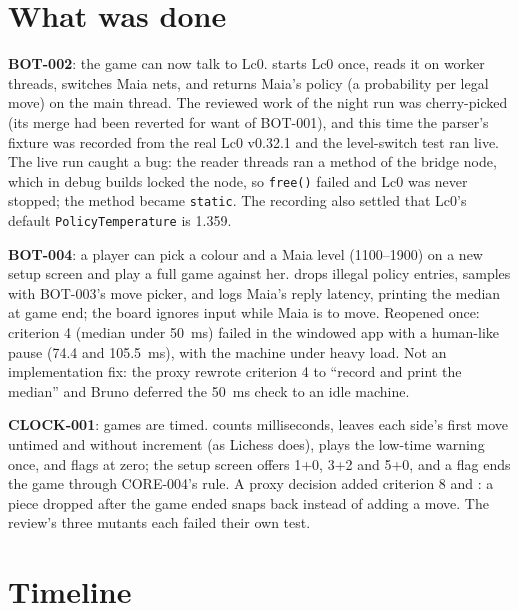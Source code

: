 \documentclass[11pt,a4paper]{article}
\begin{document}
\section*{What was done}

\textbf{BOT-002}: the game can now talk to Lc0.  starts Lc0 once, reads
it on worker threads, switches Maia nets, and returns Maia's policy (a probability per legal
move) on the main thread. The reviewed work of the night run was cherry-picked (its merge had
been reverted for want of BOT-001), and this time the parser's fixture was recorded from the
real Lc0 v0.32.1 and the level-switch test ran live. The live run caught a bug: the reader
threads ran a method of the bridge node, which in debug builds locked the node, so
\texttt{free()} failed and Lc0 was never stopped; the method became \texttt{static}. The
recording also settled that Lc0's default \texttt{PolicyTemperature} is 1.359.

\textbf{BOT-004}: a player can pick a colour and a Maia level (1100--1900) on a new setup
screen and play a full game against her.  drops illegal policy
entries, samples with BOT-003's move picker, and logs Maia's reply latency, printing the
median at game end; the board ignores input while Maia is to move. Reopened once: criterion 4
(median under 50~ms) failed in the windowed app with a human-like pause (74.4 and 105.5~ms),
with the machine under heavy load. Not an implementation fix: the proxy rewrote criterion 4 to
``record and print the median'' and Bruno deferred the 50~ms check to an idle machine.

\textbf{CLOCK-001}: games are timed.  counts milliseconds, leaves each
side's first move untimed and without increment (as Lichess does), plays the low-time warning
once, and flags at zero; the setup screen offers 1+0, 3+2 and 5+0, and a flag ends the game
through CORE-004's rule. A proxy decision added criterion 8 and : a
piece dropped after the game ended snaps back instead of adding a move. The review's three
mutants each failed their own test.

\section*{Timeline}
\end{document}
